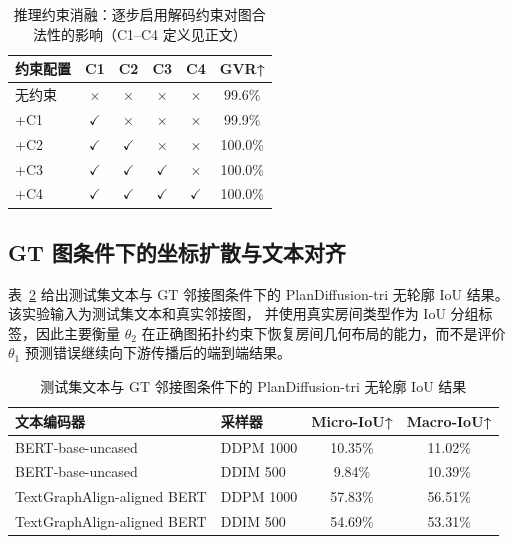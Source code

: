\begin{table}[h]
\centering
\caption{推理约束消融：逐步启用解码约束对图合法性的影响（C1--C4 定义见正文）}
\label{tab:ablation_constraints}
\small
\begin{tabular}{lccccc}
\toprule
约束配置 & C1 & C2 & C3 & C4 & GVR↑ \\
\midrule
无约束  & $\times$     & $\times$     & $\times$     & $\times$     & 99.6\%  \\
+C1    & $\checkmark$ & $\times$     & $\times$     & $\times$     & 99.9\%  \\
+C2    & $\checkmark$ & $\checkmark$ & $\times$     & $\times$     & 100.0\% \\
+C3    & $\checkmark$ & $\checkmark$ & $\checkmark$ & $\times$     & 100.0\% \\
+C4    & $\checkmark$ & $\checkmark$ & $\checkmark$ & $\checkmark$ & 100.0\% \\
\bottomrule
\end{tabular}
\end{table}

\subsection{GT 图条件下的坐标扩散与文本对齐}
\label{subsec:gt_graph_results}

表~\ref{tab:gt_graph_iou} 给出测试集文本与 GT 邻接图条件下的 PlanDiffusion-tri
无轮廓 IoU 结果。该实验输入为测试集文本和真实邻接图，
并使用真实房间类型作为 IoU 分组标签，因此主要衡量 $\theta_2$
在正确图拓扑约束下恢复房间几何布局的能力，而不是评价 $\theta_1$
预测错误继续向下游传播后的端到端结果。

\begin{table}[h]
\centering
\caption{测试集文本与 GT 邻接图条件下的 PlanDiffusion-tri 无轮廓 IoU 结果}
\label{tab:gt_graph_iou}
\small
\begin{tabular}{llcc}
\toprule
文本编码器 & 采样器 & Micro-IoU↑ & Macro-IoU↑ \\
\midrule
BERT-base-uncased & DDPM 1000 & 10.35\% & 11.02\% \\
BERT-base-uncased & DDIM 500  & 9.84\%  & 10.39\% \\
\midrule
TextGraphAlign-aligned BERT & DDPM 1000 & 57.83\% & 56.51\% \\
TextGraphAlign-aligned BERT & DDIM 500  & 54.69\% & 53.31\% \\
\bottomrule
\end{tabular}
\end{table}

